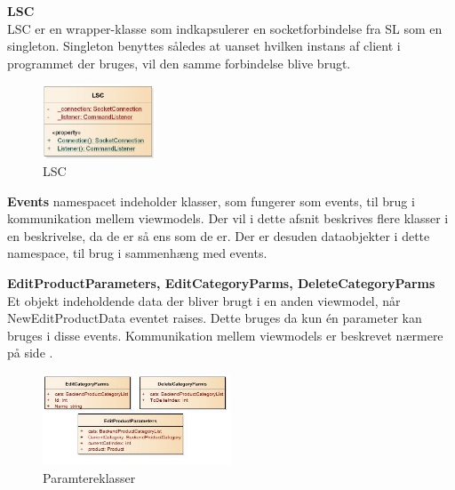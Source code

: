 \textbf{LSC}
\label{LSC_Beskrivelse}\\
LSC er en wrapper-klasse som indkapsulerer en socketforbindelse fra \gls{SL} som en singleton. Singleton benyttes således at uanset hvilken instans af  client i programmet der bruges, vil den samme forbindelse blive brugt. 
\begin{center}
\begin{figure}[!h]
    \centering
    \includegraphics[width=0.30\textwidth]{Systemdesign/backend/klassebeskrivelser/Images/LSC.png}
    \caption{LSC}
    \label{fig:modelhandler}
\end{figure}
\end{center}
\label{Modelhandler_Beskrivelse}
 \bigskip 



\bigskip
\bigskip




\textbf{Events} namespacet indeholder klasser, som fungerer som events, til brug i kommunikation mellem viewmodels. Der vil i dette afsnit beskrives flere klasser i en beskrivelse, da de er så ens som de er. Der er desuden dataobjekter i dette namespace, til brug i sammenhæng med events.\\
\bigskip

\textbf{EditProductParameters, EditCategoryParms, DeleteCategoryParms}\\
Et objekt indeholdende data der bliver brugt i en anden viewmodel, når NewEditProductData eventet raises. Dette bruges da kun én parameter kan bruges i disse events. Kommunikation mellem viewmodels er beskrevet nærmere på side \pageref{viewcomm}. \bigskip
\begin{center}
\begin{figure}[!h]
    \centering
    \includegraphics[width=0.50\textwidth]{Systemdesign/backend/klassebeskrivelser/Images/Parms.png}
    \caption{Paramtereklasser}
    \label{fig:modelhandler}
\end{figure}
\end{center}
\label{Modelhandler_Beskrivelse}
 \bigskip 

